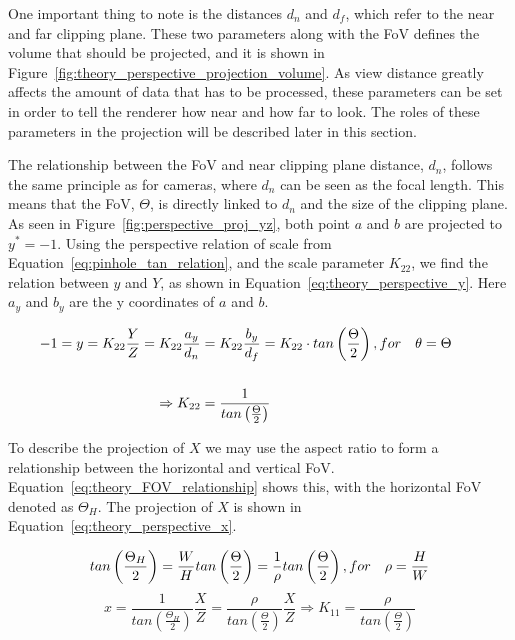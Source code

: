 One important thing to note is the distances $d_n$ and $d_f$, which refer to the near and far clipping plane. These two parameters along with the FoV defines the volume that should be projected, and it is shown in Figure~\ref{fig:theory_perspective_projection_volume}. As view distance greatly affects the amount of data that has to be processed, these parameters can be set in order to tell the renderer how near and how far to look. The roles of these parameters in the projection will be described later in this section.

The relationship between the FoV and near clipping plane distance, $d_n$, follows the same principle as for cameras, where $d_n$ can be seen as the focal length. This means that the FoV, $\Theta$, is directly linked to $d_n$ and the size of the clipping plane. As seen in Figure~\ref{fig:perspective_proj_yz}, both point $a$ and $b$ are projected to $y^*=-1$. Using the perspective relation of scale from Equation~\eqref{eq:pinhole_tan_relation}, and the scale parameter $K_{22}$, we find the relation between $y$ and $Y$, as shown in Equation~\eqref{eq:theory_perspective_y}. Here $a_y$ and $b_y$ are the y coordinates of $a$ and $b$.

\begin{equation}
    \begin{aligned}
        -1 = y = K_{22} \frac{Y}{Z} = K_{22} \frac{a_y}{d_n} &= K_{22} \frac{b_y}{d_f} = K_{22} \cdot tan\left(\frac{\Theta}{2}\right) \hfil,for \quad \theta = \Theta \\\\
        \Rightarrow K_{22} &= \frac{1}{tan\left(\frac{\Theta}{2}\right)} &&
        \label{eq:theory_perspective_y}
    \end{aligned}
\end{equation}

To describe the projection of $X$ we may use the aspect ratio to form a relationship between the horizontal and vertical FoV. Equation~\eqref{eq:theory_FOV_relationship} shows this, with the horizontal FoV denoted as $\Theta_H$. The projection of $X$ is shown in Equation~\eqref{eq:theory_perspective_x}.


\begin{equation}
    tan\left(\frac{\Theta_H}{2}\right) = \frac{W}{H}tan\left(\frac{\Theta}{2}\right) = \frac{1}{\rho}tan\left(\frac{\Theta}{2}\right) \hfill, for \quad \rho = \frac{H}{W}
    \label{eq:theory_FOV_relationship}
\end{equation}
\begin{equation}
    x = \frac{1}{tan\left(\frac{\Theta_H}{2}\right)}\frac{X}{Z} = \frac{\rho}{tan\left(\frac{\Theta}{2}\right)}\frac{X}{Z} \Rightarrow K_{11} = \frac{\rho}{tan\left(\frac{\Theta}{2}\right)}
    \label{eq:theory_perspective_x}
\end{equation}


